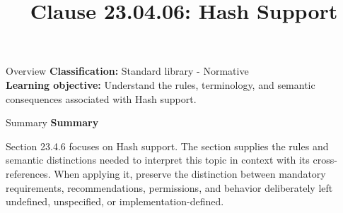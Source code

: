 \documentclass[10pt,letterpaper]{article}
\title{Clause 23.04.06: Hash Support}
\author{}
\date{}
\begin{document}
\maketitle
\begin{CornellOverviewBox}{Overview}
\textbf{Classification:} Standard library - Normative\\[2pt]
\textbf{Learning objective:} Understand the rules, terminology, and semantic consequences associated with Hash support.
\end{CornellOverviewBox}\begin{CornellSummaryBox}{Summary}
{\sffamily\bfseries\color{Accent} Summary}\par\vspace{3pt}Section 23.4.6 focuses on Hash support. The section supplies the rules and semantic distinctions needed to interpret this topic in context with its cross-references. When applying it, preserve the distinction between mandatory requirements, recommendations, permissions, and behavior deliberately left undefined, unspecified, or implementation-defined.
\end{CornellSummaryBox}
\end{document}
